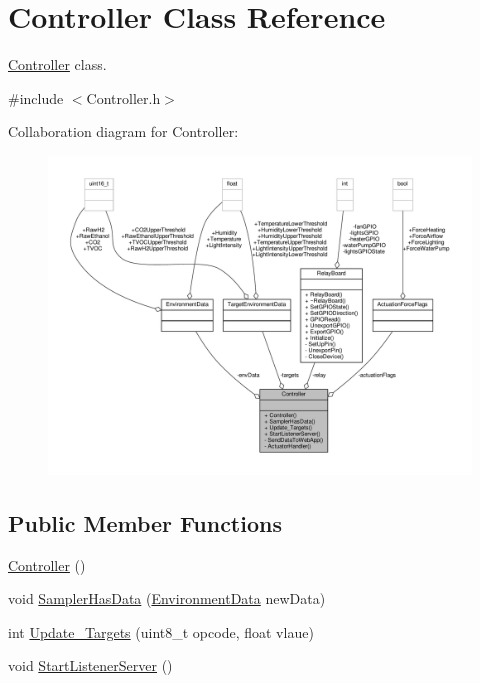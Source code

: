 \hypertarget{classController}{}\section{Controller Class Reference}
\label{classController}


\hyperlink{classController}{Controller} class.  




{\ttfamily \#include $<$Controller.\+h$>$}



Collaboration diagram for Controller\+:\nopagebreak
\begin{figure}[H]
\begin{center}
\leavevmode
\includegraphics[width=350pt]{classController__coll__graph}
\end{center}
\end{figure}
\subsection*{Public Member Functions}
\begin{DoxyCompactItemize}
\item 
\hyperlink{classController_a95c56822d667e94b031451729ce069a9}{Controller} ()
\item 
void \hyperlink{classController_a4b765eaaf8f72e964118967f86c265e2}{Sampler\+Has\+Data} (\hyperlink{structEnvironmentData}{Environment\+Data} new\+Data)
\item 
int \hyperlink{classController_a0eb08a1d38b2c79e2d140476fd097f24}{Update\+\_\+\+Targets} (uint8\+\_\+t opcode, float vlaue)
\item 
void \hyperlink{classController_a64173dd00be020975d7db533cd280c15}{Start\+Listener\+Server} ()
\end{DoxyCompactItemize}
